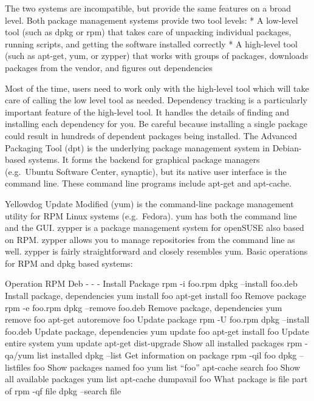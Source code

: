 The two systems are incompatible, but provide the same features on a
broad level. Both package management systems provide two tool levels: *
A low-level tool (such as dpkg or rpm) that takes care of unpacking
individual packages, running scripts, and getting the software installed
correctly * A high-level tool (such as apt-get, yum, or zypper) that
works with groups of packages, downloads packages from the vendor, and
figures out dependencies

Most of the time, users need to work only with the high-level tool which
will take care of calling the low level tool as needed. Dependency
tracking is a particularly important feature of the high-level tool. It
handles the details of finding and installing each dependency for you.
Be careful because installing a single package could result in hundreds
of dependent packages being installed. The Advanced Packaging Tool (dpt)
is the underlying package management system in Debian-based systems. It
forms the backend for graphical package managers (e.g.~Ubuntu Software
Center, synaptic), but its native user interface is the command line.
These command line programs include apt-get and apt-cache.

Yellowdog Update Modified (yum) is the command-line package management
utility for RPM Linux systems (e.g.~Fedora). yum has both the command
line and the GUI. zypper is a package management system for openSUSE
also based on RPM. zypper allows you to manage repositories from the
command line as well. zypper is fairly straightforward and closely
resembles yum. Basic operations for RPM and dpkg based systems:

Operation \textbar{} RPM \textbar{}Deb - \textbar{}- \textbar{}- Install
Package \textbar{} rpm -i foo.rpm \textbar{} dpkg --install foo.deb
Install package, dependencies \textbar{} yum install foo \textbar{}
apt-get install foo Remove package \textbar{} rpm -e foo.rpm \textbar{}
dpkg --remove foo.deb Remove package, dependencies \textbar{} yum remove
foo \textbar{} apt-get autoremove foo Update package \textbar{} rpm -U
foo.rpm \textbar{} dpkg --install foo.deb Update package, dependencies
\textbar{} yum update foo \textbar{} apt-get install foo Update entire
system \textbar{} yum update \textbar{} apt-get dist-upgrade Show all
installed packages \textbar{} rpm -qa/yum list installed \textbar{} dpkg
--list Get information on package \textbar{} rpm -qil foo \textbar{}
dpkg --listfiles foo Show packages named foo \textbar{} yum list ``foo''
\textbar{} apt-cache search foo Show all available packages \textbar{}
yum list \textbar{} apt-cache dumpavail foo What package is file part of
\textbar{} rpm -qf file \textbar{} dpkg --search file

